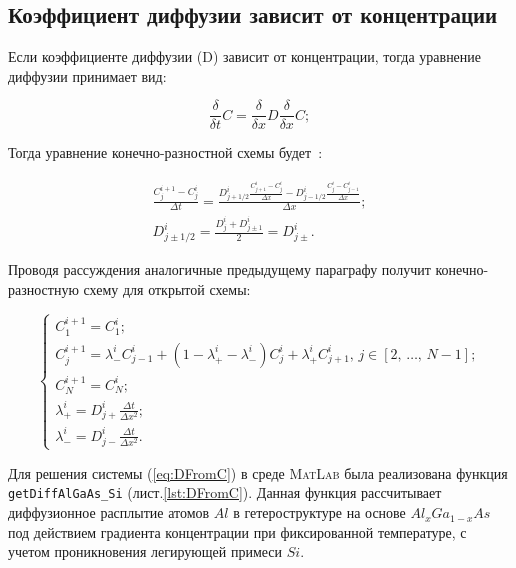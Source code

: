 \subsection{Коэффициент диффузии зависит от концентрации}

Если коэффициенте диффузии (D) зависит от концентрации, тогда уравнение диффузии принимает вид:

\begin{equation}\label{eq:diffD(x)t}
	\frac{\delta}{\delta t} C = \frac{\delta}{\delta x}D\frac{\delta}{\delta x} C;
\end{equation}

Тогда уравнение конечно-разностной схемы будет~\cite{FDDiff}:

\begin{gather}\label{eq:diffD(x)tFD}
	\frac{C_{j}^{i+1} - C_{j}^{i}}{\Delta t} = \frac{ D_{j+1/2}^{i}\frac{C^{i}_{j+1} - C^{i}_{j}}{\Delta x} - D_{j-1/2}^{i}\frac{C^{i}_{j} - C^{i}_{j-1}}{\Delta x} }{\Delta x};\\
	D_{j\pm1/2}^{i} = \frac{D^{i}_{j} + D^{i}_{j\pm1}}{2} = D_{j\pm}^{i}.
\end{gather}

Проводя рассуждения аналогичные предыдущему параграфу получит конечно-разностную схему для открытой схемы:

\begin{equation}
	\label{eq:DFromC}
	\begin{cases}
		C^{i+1}_{1} = C^{i}_{1};\\
		C^{i+1}_{j} = \lambda_{-}^{i} C^{i}_{j-1} + (1 - \lambda^{i}_{+} - \lambda^{i}_{-})C^{i}_{j} + \lambda^{i}_{+} C^{i}_{j+1},\,j \in [2,\,\dots,\,N-1];\\
		C^{i+1}_{N} = C^{i}_{N};\\
		\lambda^{i}_{+} = D_{j+}^{i}\frac{\Delta t}{\Delta x^{2}};\\
		\lambda^{i}_{-} = D_{j-}^{i}\frac{\Delta t}{\Delta x^{2}}.
	\end{cases}
\end{equation}

Для решения системы (\ref{eq:DFromC}) в среде \textsc{MatLab} была реализована функция \texttt{getDiffAlGaAs\_Si} (лист.\ref{lst:DFromC}). Данная функция рассчитывает диффузионное расплытие атомов $Al$ в гетероструктуре на основе $Al_{x}Ga_{1-x}As$ под действием градиента концентрации при фиксированной температуре, с учетом проникновения легирующей примеси $Si$.


